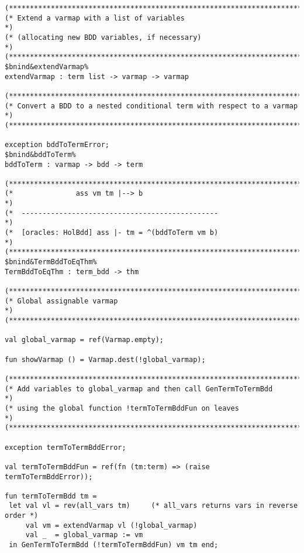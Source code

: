 \documentclass[12pt]{article}
\begin{document}
\begin{footnotesize}
\begin{Verbatim}[commandchars=\$\&\%]
(*****************************************************************************)
(* Extend a varmap with a list of variables                                  *)
(* (allocating new BDD variables, if necessary)                              *)
(*****************************************************************************)
$bnind&extendVarmap%
extendVarmap : term list -> varmap -> varmap

(*****************************************************************************)
(* Convert a BDD to a nested conditional term with respect to a varmap       *)
(*****************************************************************************)

exception bddToTermError;
$bnind&bddToTerm%
bddToTerm : varmap -> bdd -> term

(*****************************************************************************)
(*               ass vm tm |--> b                                            *)
(*  -----------------------------------------------                          *)
(*  [oracles: HolBdd] ass |- tm = ^(bddToTerm vm b)                          *)
(*****************************************************************************)
$bnind&TermBddToEqThm%
TermBddToEqThm : term_bdd -> thm

(*****************************************************************************)
(* Global assignable varmap                                                  *)
(*****************************************************************************)

val global_varmap = ref(Varmap.empty);

fun showVarmap () = Varmap.dest(!global_varmap);

(*****************************************************************************)
(* Add variables to global_varmap and then call GenTermToTermBdd             *)
(* using the global function !termToTermBddFun on leaves                     *)
(*****************************************************************************)

exception termToTermBddError;

val termToTermBddFun = ref(fn (tm:term) => (raise termToTermBddError));

fun termToTermBdd tm =
 let val vl = rev(all_vars tm)     (* all_vars returns vars in reverse order *)
     val vm = extendVarmap vl (!global_varmap)
     val _  = global_varmap := vm
 in GenTermToTermBdd (!termToTermBddFun) vm tm end;


\end{Verbatim}
\end{footnotesize}
\end{document}
